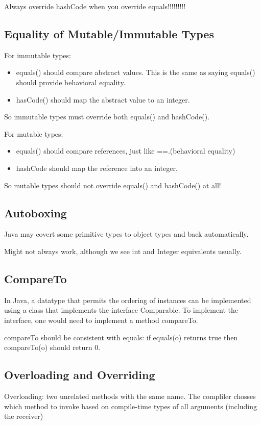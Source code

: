 \documentclass[letterpaper,12pt]{article}
\begin{document}
Always override hashCode when you override equals!!!!!!!!!

\subsection{Equality of Mutable/Immutable Types}
For immutable types:
\begin{itemize}
      \item equals() should compare abstract values. This is the same as saying equals()
            should provide behavioral equality.
      \item hasCode() should map the abstract value to an integer.
\end{itemize}
So immutable types must override both equals() and hashCode().

For mutable types:
\begin{itemize}
      \item equals() should compare references, just like ==.(behavioral equality)
      \item hashCode should map the reference into an integer.
\end{itemize}
So mutable types should not override equals() and hashCode() at all!

\subsection{Autoboxing}

Java may covert some primitive types to object types and back automatically.

Might not always work, although we see int and Integer equivalents usually.

\subsection{CompareTo}
In Java, a datatype that permits the ordering of instances can be implemented using
a class that implements the interface Comparable. To implement the interface,
one would need to implement a method compareTo.

compareTo should be consistent with equals: if equals(o) returns true then
compareTo(o) should return 0.

\subsection{Overloading and Overriding}

Overloading: two unrelated methods with the same name. The compliler chosses
which method to invoke based on compile-time types of all arguments (including
the receiver)
\end{document}
